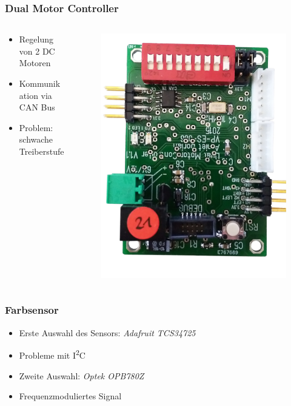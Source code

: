 \begin{frame}
	\frametitle{Dual Motor Controller}
	
	\begin{columns}[T]
		\begin{column}{0.45\textwidth}
			\begin{center}
				\begin{itemize}
					\item Regelung von 2 DC Motoren
					\item Kommunikation via CAN Bus
					\item Problem: schwache Treiberstufe
				\end{itemize}
			\end{center}
		\end{column}
		\begin{column}{0.45\textwidth}
			\begin{figure}
				\includegraphics[width=0.7\columnwidth, angle=180, origin=c]{../images/presentation/DMC.jpg}
			\end{figure}
		\end{column}
	\end{columns}
	
\end{frame}

\begin{frame}
	\frametitle{Farbsensor}
	
	\begin{itemize}
		\item Erste Auswahl des Sensors: \textit{Adafruit TCS34725}
		\item Probleme mit I\textsuperscript{2}C
		\item Zweite Auswahl: \textit{Optek OPB780Z}
		\item Frequenzmoduliertes Signal
	\end{itemize}
	
\end{frame}
